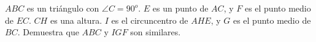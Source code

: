 $ABC$ es un triángulo con $\angle C = 90^o$. $E$ es un punto de $AC$, y $F$ es el punto medio de $EC$. $CH$ es una altura. $I$ es el circuncentro de $AHE$, y $G$ es el punto medio de $BC$. Demuestra que $ABC$ y $IGF$ son similares. 
